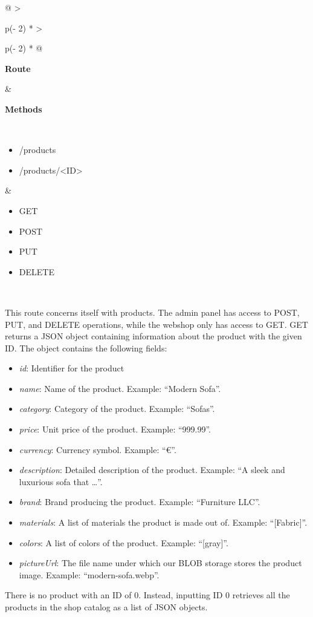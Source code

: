 \begin{longtable}[]{@{}
    >{\raggedright\arraybackslash}p{(\columnwidth - 2\tabcolsep) * }
    >{\raggedright\arraybackslash}p{(\columnwidth - 2\tabcolsep) * }@{}}
\toprule
\begin{minipage}[b]{\linewidth}\raggedright
\textbf{Route}
\end{minipage} & \begin{minipage}[b]{\linewidth}\raggedright
\textbf{Methods}
\end{minipage} \\
\midrule
\endhead
\begin{itemize}
    \item /products
    \item /products/<ID>
\end{itemize} &
\begin{itemize}
  \item GET
  \item POST
  \item PUT
  \item DELETE
\end{itemize} \\
\bottomrule
\end{longtable}

This route concerns itself with products. The admin panel has access to POST, PUT, and DELETE operations, 
while the webshop only has access to GET. GET returns a JSON object containing information about
the product with the given ID.
The object contains the following fields:
\begin{itemize}
    \item \textit{id}: Identifier for the product
    \item \textit{name}: Name of the product. Example: “Modern Sofa”.
    \item \textit{category}: Category of the product. Example: “Sofas”.
    \item \textit{price}: Unit price of the product. Example: “999.99”.
    \item \textit{currency}: Currency symbol. Example: “€”.
    \item \textit{description}: Detailed description of the product. Example: “A sleek and luxurious sofa that \dots”.
    \item \textit{brand}: Brand producing the product. Example: “Furniture LLC”.
    \item \textit{materials}: A list of materials the product is made out of. Example: “[Fabric]”.
    \item \textit{colors}: A list of colors of the product. Example: “[gray]”.
    \item \textit{pictureUrl}: The file name under which our BLOB storage stores the product image. Example: “modern-sofa.webp”.
\end{itemize}
There is no product with an ID of 0. Instead, inputting ID 0 retrieves all the products in the shop catalog
as a list of JSON objects.

